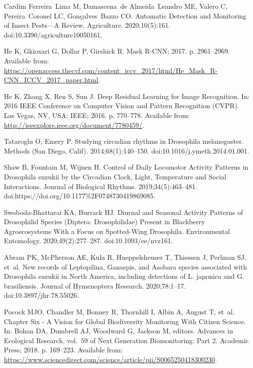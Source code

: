 \documentclass[12pt]{article}
\begin{document}
\begin{thebibliography}{10}
	Cardim Ferreira~Lima M, Damascena~de Almeida~Leandro ME, Valero C,
	Pereira~Coronel LC, Gonçalves~Bazzo CO.
	\newblock Automatic {Detection} and {Monitoring} of {Insect} {Pests}—{A}
	{Review}.
	\newblock Agriculture. 2020;10(5):161.
	\newblock doi:{10.3390/agriculture10050161}.
	
	He K, Gkioxari G, Dollar P, Girshick R.
	\newblock Mask {R}-{CNN}; 2017. p. 2961--2969.
	\newblock Available from:
	\url{https://openaccess.thecvf.com/content_iccv_2017/html/He_Mask_R-CNN_ICCV_2017_paper.html}.
	
	He K, Zhang X, Ren S, Sun J.
	\newblock Deep {Residual} {Learning} for {Image} {Recognition}.
	\newblock In: 2016 {IEEE} {Conference} on {Computer} {Vision} and {Pattern}
	{Recognition} ({CVPR}). Las Vegas, NV, USA: IEEE; 2016. p. 770--778.
	\newblock Available from: \url{http://ieeexplore.ieee.org/document/7780459/}.
	
	Tataroglu O, Emery P.
	\newblock Studying circadian rhythms in {Drosophila} melanogaster.
	\newblock Methods (San Diego, Calif). 2014;68(1):140--150.
	\newblock doi:{10.1016/j.ymeth.2014.01.001}.
	
	Shaw B, Fountain M, Wijnen H.
	\newblock Control of {Daily} {Locomotor} {Activity} {Patterns} in {Drosophila}
	suzukii by the {Circadian} {Clock}, {Light}, {Temperature} and {Social}
	{Interactions}.
	\newblock Journal of Biological Rhythms. 2019;34(5):463--481.
	\newblock doi:{https://doi.org/10.1177\%2F0748730419869085}.
	
	Swoboda-Bhattarai KA, Burrack HJ.
	\newblock Diurnal and {Seasonal} {Activity} {Patterns} of {Drosophilid}
	{Species} ({Diptera}: {Drosophilidae}) {Present} in {Blackberry}
	{Agroecosystems} {With} a {Focus} on {Spotted}-{Wing} {Drosophila}.
	\newblock Environmental Entomology. 2020;49(2):277--287.
	\newblock doi:{10.1093/ee/nvz161}.
	
	Abram PK, McPherson AE, Kula R, Hueppelsheuser T, Thiessen J, Perlman SJ,
	et~al.
	\newblock New records of {Leptopilina}, {Ganaspis}, and {Asobara} species
	associated with {Drosophila} suzukii in {North} {America}, including
	detections of {L}. japonica and {G}. brasiliensis.
	\newblock Journal of Hymenoptera Research. 2020;78:1--17.
	\newblock doi:{10.3897/jhr.78.55026}.
	
	Pocock MJO, Chandler M, Bonney R, Thornhill I, Albin A, August T, et~al.
	\newblock Chapter {Six} - {A} {Vision} for {Global} {Biodiversity} {Monitoring}
	{With} {Citizen} {Science}.
	\newblock In: Bohan DA, Dumbrell AJ, Woodward G, Jackson M, editors. Advances
	in {Ecological} {Research}. vol.~59 of Next {Generation} {Biomonitoring}:
	{Part} 2. Academic Press; 2018. p. 169--223.
	\newblock Available from:
	\url{https://www.sciencedirect.com/science/article/pii/S0065250418300230}.
	

\end{thebibliography}
\end{document}
